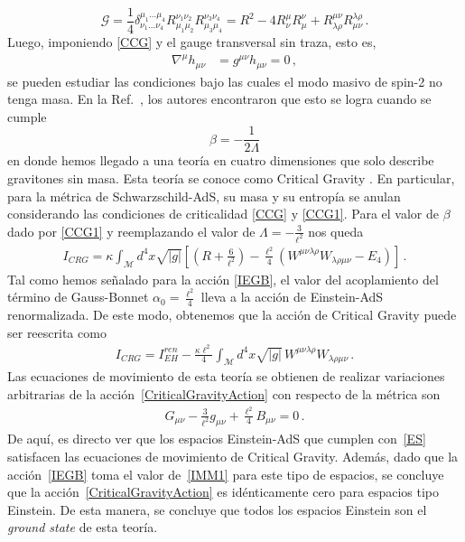 \documentclass[../Main.tex]{subfiles}
\begin{document}
\begin{equation*}
\mathcal{G} = \dfrac{1}{4} \delta _{\nu _{1} \ldots  \nu _{4}}^{\mu _{1} \ldots  \mu _{4}} R_{\mu _{1} \mu _{2}}^{\nu _{1} \nu _{2}} R_{\mu _{3} \mu _{4}}^{\nu _{3} \nu _{4}} = R^2 - 4R^\mu_\nu R^\nu_\mu + R^{\mu\nu}_{\lambda\rho}R^{\lambda\rho}_{\mu\nu} \,.
\end{equation*}
Luego, imponiendo \eqref{CCG} y el gauge transversal sin traza, esto es,
\begin{align}
    \nabla^{\mu}h_{\mu\nu}&=g^{\mu\nu}h_{\mu\nu}=0\,,
\end{align}
se pueden estudiar las condiciones bajo las cuales el modo masivo de spin-2 no tenga masa. En la Ref.~\cite{Lu:2011ks}, los autores encontraron que esto se logra cuando se cumple 
\begin{equation}
    \beta=-\frac{1}{2\Lambda} \label{CCG1}
\end{equation}
en donde hemos llegado a una teoría en cuatro dimensiones que solo describe gravitones sin masa. Esta teoría se conoce como Critical Gravity \cite{Lu:2011zk}. En particular, para la métrica de Schwarzschild-AdS, su masa y su entropía se anulan considerando las condiciones de criticalidad \eqref{CCG} y \eqref{CCG1}. Para el valor de $\beta$ dado por \eqref{CCG1} y reemplazando el valor de $\Lambda=-\tfrac{3}{\ell^2}$ nos queda
\begin{align}
    I_{CRG} = \kappa\int_{\mathcal{M}} d^{4}x \sqrt{\lvert g\rvert} \left[\left(R+\frac{6}{\ell^2}\right)  -\frac{\ell^2}{4}\left(W^{\mu\nu\lambda\rho}W_{\lambda\rho\mu\nu}-E_4\right)\right] \,.
\end{align}
Tal como hemos señalado para la acción \eqref{IEGB}, el valor del acoplamiento del término de Gauss-Bonnet $\alpha_0=\tfrac{\ell^2}{4}$ lleva a la acción de Einstein-AdS renormalizada. De este modo, obtenemos que la acción de Critical Gravity puede ser reescrita como~\cite{Anastasiou:2017rjf}
\begin{align}
    I_{CRG} = I_{EH}^{ren}-\frac{\kappa\ell^2}{4}\int_{\mathcal{M}} d^{4}x\sqrt{\lvert g\rvert}\,W^{\mu\nu\lambda\rho}W_{\lambda\rho\mu\nu}\,.\label{CriticalGravityAction}
\end{align}
Las ecuaciones de movimiento de esta teoría se obtienen de realizar variaciones arbitrarias de la acción~\eqref{CriticalGravityAction} con respecto de la métrica son
\begin{align}\label{eomcritical}
    G_{\mu\nu} - \frac{3}{\ell^2}g_{\mu\nu} + \frac{\ell^2}{4}B_{\mu\nu} = 0\,.
\end{align}
De aquí, es directo ver que los espacios Einstein-AdS que cumplen con~\eqref{ES} satisfacen las ecuaciones de movimiento de Critical Gravity. Además, dado que la acción~\eqref{IEGB} toma el valor de~\eqref{IMM1} para este tipo de espacios, se concluye que la acción~\eqref{CriticalGravityAction} es idénticamente cero para espacios tipo Einstein. De esta manera, se concluye que todos los espacios Einstein son el \textit{ground state} de esta teoría.
\end{document}
